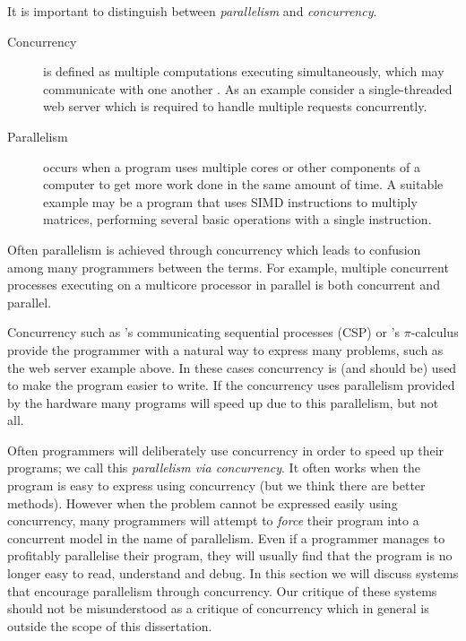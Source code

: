 It is important to distinguish between \emph{parallelism} and
\emph{concurrency}.

\begin{description}
    \item[Concurrency] is defined as multiple computations executing simultaneously,
    which may communicate with one another \citep{hoare:1978:csp}.
    As an example consider a single-threaded web server which is required to
    handle multiple requests concurrently.

    \item[Parallelism] occurs when a program uses multiple cores or other
    components of a computer to get more work done in the same amount of
    time.
    A suitable example may be a program that uses SIMD instructions to
    multiply matrices, performing several basic operations with a single
    instruction.
\end{description}

\noindent
Often parallelism is achieved through concurrency
which leads to confusion among many programmers between the terms.
For example,
multiple concurrent processes executing on a multicore processor in parallel
is both concurrent and parallel.

Concurrency such as \citet{hoare:1978:csp}'s
communicating sequential processes (CSP)
or \citet{milner:pi}'s $\pi$-calculus
provide the programmer with a natural way to express many problems,
such as the web server example above.
In these cases concurrency is (and should be) used to make the program
easier to write.
If the concurrency uses parallelism provided by the hardware many programs
will speed up due to this parallelism,
but not all.

Often programmers will deliberately use concurrency in order to speed up
their programs;
we call this \emph{parallelism via concurrency}.
It often works when the program is easy to express using concurrency
(but we think there are better methods).
However when the problem cannot be expressed easily using concurrency,
many programmers will attempt to \emph{force} their program into a concurrent
model in the name of parallelism.
Even if a programmer manages to profitably parallelise their program,
they will usually find that the program is no longer easy to read, understand
and debug.
In this section we will discuss systems that encourage parallelism through
concurrency.
Our critique of these systems should not be misunderstood as a critique of
concurrency which in general is outside the scope of this dissertation.

